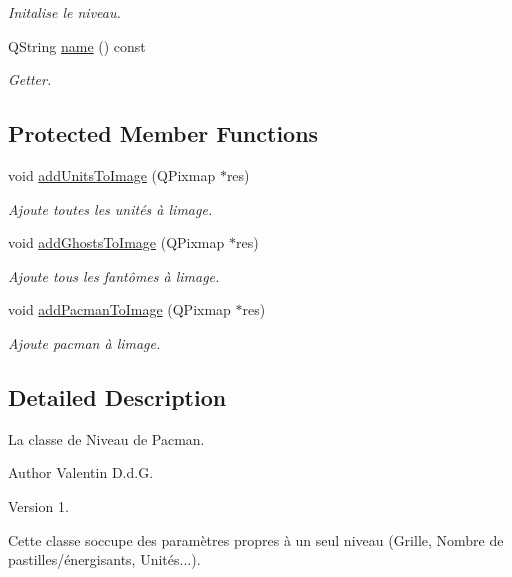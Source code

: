 \begin{DoxyCompactItemize}
\begin{DoxyCompactList}\small\item\em Initalise le niveau. \end{DoxyCompactList}\item 
Q\+String \hyperlink{class_level_a8d5d0dee7439f36dfe2c55f4d90ef8d9}{name} () const 
\begin{DoxyCompactList}\small\item\em Getter. \end{DoxyCompactList}\end{DoxyCompactItemize}
\subsection*{Protected Member Functions}
\begin{DoxyCompactItemize}
\item 
void \hyperlink{class_level_a95500fd5118b926928fb078d93c5f662}{add\+Units\+To\+Image} (Q\+Pixmap $\ast$res)
\begin{DoxyCompactList}\small\item\em Ajoute toutes les unités à l\textquotesingle{}image. \end{DoxyCompactList}\item 
void \hyperlink{class_level_a8f0671e3c309756abb0fc819a340775e}{add\+Ghosts\+To\+Image} (Q\+Pixmap $\ast$res)
\begin{DoxyCompactList}\small\item\em Ajoute tous les fantômes à l\textquotesingle{}image. \end{DoxyCompactList}\item 
void \hyperlink{class_level_a05dd1ccdace4c4b4428ebaca9c659ca9}{add\+Pacman\+To\+Image} (Q\+Pixmap $\ast$res)
\begin{DoxyCompactList}\small\item\em Ajoute pacman à l\textquotesingle{}image. \end{DoxyCompactList}\end{DoxyCompactItemize}


\subsection{Detailed Description}
La classe de Niveau de Pacman. 

\begin{DoxyAuthor}{Author}
Valentin D.\+d.\+G. 
\end{DoxyAuthor}
\begin{DoxyVersion}{Version}
1.
\end{DoxyVersion}
Cette classe s\textquotesingle{}occupe des paramètres propres à un seul niveau (Grille, Nombre de pastilles/énergisants, Unités...). 

